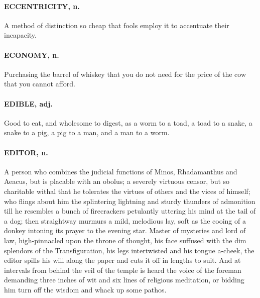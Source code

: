 \documentclass[11pt]{article}
\begin{document}
\paragraph{ECCENTRICITY, n.}  A method of distinction so cheap that fools employ
it to accentuate their incapacity.

\paragraph{ECONOMY, n.}  Purchasing the barrel of whiskey that you do not need for
the price of the cow that you cannot afford.

\paragraph{EDIBLE, adj.}  Good to eat, and wholesome to digest, as a worm to a
toad, a toad to a snake, a snake to a pig, a pig to a man, and a man
to a worm.

\paragraph{EDITOR, n.}  A person who combines the judicial functions of Minos,
Rhadamanthus and Aeacus, but is placable with an obolus; a severely
virtuous censor, but so charitable withal that he tolerates the
virtues of others and the vices of himself; who flings about him the
splintering lightning and sturdy thunders of admonition till he
resembles a bunch of firecrackers petulantly uttering his mind at the
tail of a dog; then straightway murmurs a mild, melodious lay, soft as
the cooing of a donkey intoning its prayer to the evening star.
Master of mysteries and lord of law, high-pinnacled upon the throne of
thought, his face suffused with the dim splendors of the
Transfiguration, his legs intertwisted and his tongue a-cheek, the
editor spills his will along the paper and cuts it off in lengths to
suit.  And at intervals from behind the veil of the temple is heard
the voice of the foreman demanding three inches of wit and six lines
of religious meditation, or bidding him turn off the wisdom and whack
up some pathos.
\end{document}
